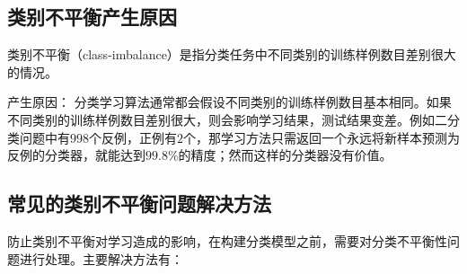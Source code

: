 \subsection{类别不平衡产生原因}

类别不平衡（class-imbalance）是指分类任务中不同类别的训练样例数目差别很大的情况。 


产生原因： 分类学习算法通常都会假设不同类别的训练样例数目基本相同。如果不同类别的训练样例数目差别很大，则会影响学习结果，测试结果变差。例如二分类问题中有$998$个反例，正例有$2$个，那学习方法只需返回一个永远将新样本预测为反例的分类器，就能达到$99.8\%$的精度；然而这样的分类器没有价值。

\subsection{常见的类别不平衡问题解决方法}

防止类别不平衡对学习造成的影响，在构建分类模型之前，需要对分类不平衡性问题进行处理。主要解决方法有：

